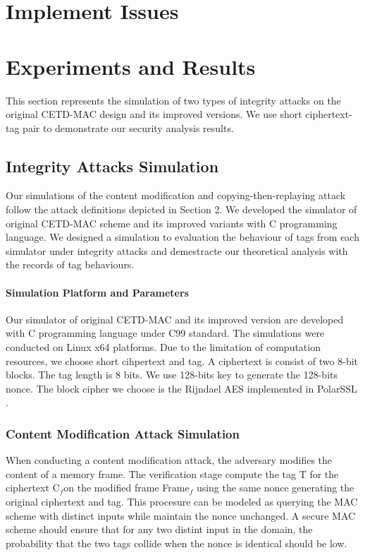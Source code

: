 \documentclass{article}
\begin{document}

\printnomenclature
\section{Implement Issues}
\section{Experiments and Results}
This section represents the simulation of two types of integrity attacks on the original CETD-MAC design and its improved versions. We use short ciphertext-tag pair to demonstrate our security analysis results. 
\subsection{Integrity Attacks Simulation}
Our simulations of the content modification and copying-then-replaying attack follow the attack definitions depicted in Section 2. We developed the simulator of original CETD-MAC scheme and its improved variants with C programming language. We designed a simulation to evaluation the behaviour of tags from each simulator under integrity attacks and demestracte our theoretical analysis with the records of tag behaviours. 
\paragraph{Simulation Platform and Parameters}
Our simulator of original CETD-MAC and its improved version are developed with C programming language under C99 standard. The simulations were conducted on Linux x64 platforms. Due to the limitation of computation resources, we choose short cihpertext and tag. A ciphertext is consist of two 8-bit blocks. The tag length is 8 bits. We use 128-bits key to generate the 128-bits nonce. The block cipher we choose is the Rijndael AES implemented in PolarSSL \cite{}.   
\subsubsection{Content Modification Attack Simulation}
When conducting a content modification attack, the adversary modifies the content of a memory frame. The verification stage compute the tag T for the ciphertext C$_{f}$on the modified frame Frame$_{f}$ using the same nonce generating the original ciphertext and tag.
This procesure can be modeled as querying the MAC scheme with distinct inputs while maintain the nonce unchanged. A secure MAC scheme should ensure that for any two distint input in the domain, the probability that the two tags collide when the nonce is identical should be low.
\end{document}
